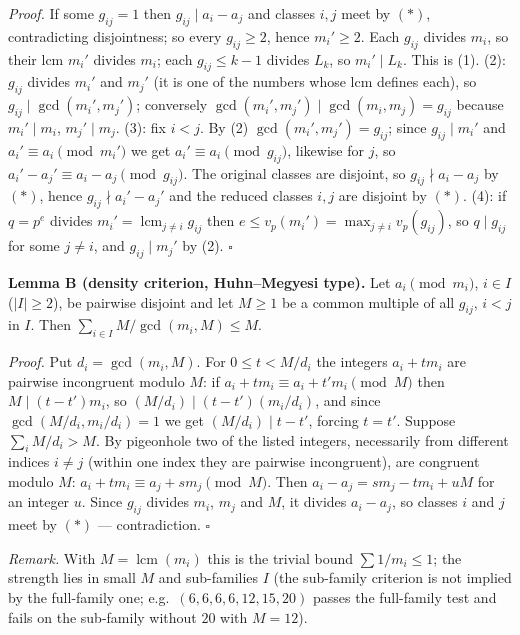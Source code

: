 \emph{Proof.} If some \(g_{ij}=1\) then \(g_{ij}\mid a_i-a_j\) and
classes \(i,j\) meet by \((*)\), contradicting disjointness; so every
\(g_{ij}\ge2\), hence \(m_i'\ge2\). Each \(g_{ij}\) divides \(m_i\), so
their lcm \(m_i'\) divides \(m_i\); each \(g_{ij}\le k-1\) divides
\(L_k\), so \(m_i'\mid L_k\). This is (1). (2): \(g_{ij}\) divides
\(m_i'\) and \(m_j'\) (it is one of the numbers whose lcm defines each),
so \(g_{ij}\mid\gcd(m_i',m_j')\); conversely
\(\gcd(m_i',m_j')\mid\gcd(m_i,m_j)=g_{ij}\) because \(m_i'\mid m_i\),
\(m_j'\mid m_j\). (3): fix \(i<j\). By (2) \(\gcd(m_i',m_j')=g_{ij}\);
since \(g_{ij}\mid m_i'\) and \(a_i'\equiv a_i\pmod{m_i'}\) we get
\(a_i'\equiv a_i\pmod{g_{ij}}\), likewise for \(j\), so
\(a_i'-a_j'\equiv a_i-a_j\pmod{g_{ij}}\). The original classes are
disjoint, so \(g_{ij}\nmid a_i-a_j\) by \((*)\), hence
\(g_{ij}\nmid a_i'-a_j'\) and the reduced classes \(i,j\) are disjoint
by \((*)\). (4): if \(q=p^e\) divides
\(m_i'=\operatorname{lcm}_{j\ne i} g_{ij}\) then
\(e\le v_p(m_i')=\max_{j\ne i}v_p(g_{ij})\), so \(q\mid g_{ij}\) for
some \(j\ne i\), and \(g_{ij}\mid m_j'\) by (2). \(\square\)

\textbf{Lemma B (density criterion, Huhn--Megyesi type).} Let
\(a_i\pmod{m_i}\), \(i\in I\) (\(|I|\ge2\)), be pairwise disjoint and
let \(M\ge1\) be a common multiple of all \(g_{ij}\), \(i<j\) in \(I\).
Then \(\sum_{i\in I} M/\gcd(m_i,M)\le M\).

\emph{Proof.} Put \(d_i=\gcd(m_i,M)\). For \(0\le t<M/d_i\) the integers
\(a_i+tm_i\) are pairwise incongruent modulo \(M\): if
\(a_i+tm_i\equiv a_i+t'm_i\pmod M\) then \(M\mid (t-t')m_i\), so
\((M/d_i)\mid (t-t')(m_i/d_i)\), and since \(\gcd(M/d_i,m_i/d_i)=1\) we
get \((M/d_i)\mid t-t'\), forcing \(t=t'\). Suppose \(\sum_i M/d_i>M\).
By pigeonhole two of the listed integers, necessarily from different
indices \(i\ne j\) (within one index they are pairwise incongruent), are
congruent modulo \(M\): \(a_i+tm_i\equiv a_j+sm_j\pmod M\). Then
\(a_i-a_j=sm_j-tm_i+uM\) for an integer \(u\). Since \(g_{ij}\) divides
\(m_i\), \(m_j\) and \(M\), it divides \(a_i-a_j\), so classes \(i\) and
\(j\) meet by \((*)\) --- contradiction. \(\square\)

\emph{Remark.} With \(M=\operatorname{lcm}(m_i)\) this is the trivial
bound \(\sum 1/m_i\le1\); the strength lies in small \(M\) and
sub-families \(I\) (the sub-family criterion is not implied by the
full-family one; e.g.~\((6,6,6,6,12,15,20)\) passes the full-family test
and fails on the sub-family without \(20\) with \(M=12\)).

